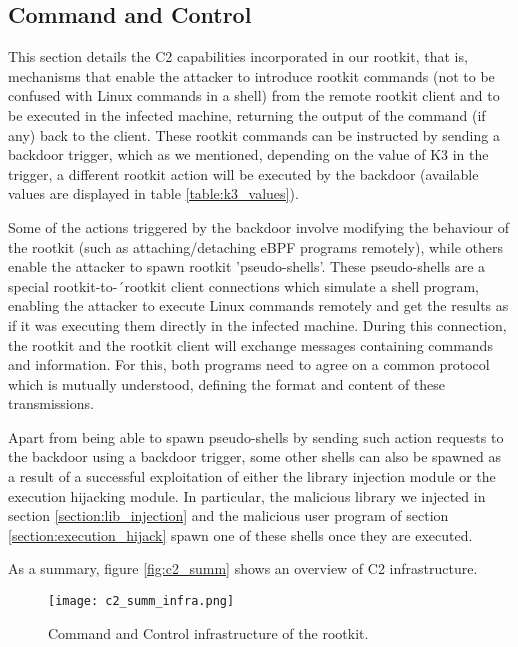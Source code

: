 \subsection{Command and Control} \label{subsection:c2}
This section details the C2 capabilities incorporated in our rootkit, that is, mechanisms that enable the attacker to introduce rootkit commands (not to be confused with Linux commands in a shell) from the remote rootkit client and to be executed in the infected machine, returning the output of the command (if any) back to the client. These rootkit commands can be instructed by sending a backdoor trigger, which as we mentioned, depending on the value of K3 in the trigger, a different rootkit action will be executed by the backdoor (available values are displayed in table \ref{table:k3_values}).

Some of the actions triggered by the backdoor involve modifying the behaviour of the rootkit (such as attaching/detaching eBPF programs remotely), while others enable the attacker to spawn rootkit 'pseudo-shells'. These pseudo-shells are a special rootkit-to-´rootkit client connections which simulate a shell program, enabling the attacker to execute Linux commands remotely and get the results as if it was executing them directly in the infected machine. During this connection, the rootkit and the rootkit client will exchange messages containing commands and information. For this, both programs need to agree on a common protocol which is mutually understood, defining the format and content of these transmissions.

Apart from being able to spawn pseudo-shells by sending such action requests to the backdoor using a backdoor trigger, some other shells can also be spawned as a result of a successful exploitation of either the library injection module or the execution hijacking module. In particular, the malicious library we injected in section \ref{section:lib_injection} and the malicious user program of section \ref{section:execution_hijack} spawn one of these shells once they are executed.

As a summary, figure \ref{fig:c2_summ} shows an overview of C2 infrastructure.

\begin{figure}[htbp]
	\centering
	\texttt{[image: c2\_summ\_infra.png]}
	\caption{Command and Control infrastructure of the rootkit.}
	\label{fig:c2_summ_infra}
\end{figure}

